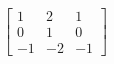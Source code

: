 \documentclass[preview]{standalone}
\begin{document}
\begin{align*}
\begin{bmatrix} 1 & 2 & 1 \\ 0 & 1 & 0 \\ -1 & -2 & -1 \end{bmatrix}
\end{align*}
\end{document}
